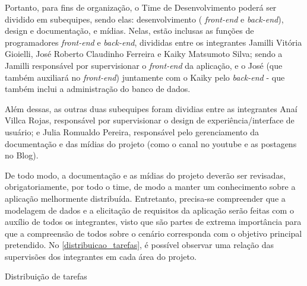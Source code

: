 Portanto, para fins de organização, o Time de Desenvolvimento poderá ser dividido em subequipes, sendo elas: desenvolvimento ( \textsl{\gls{front-end}} e \textsl{\gls{back-end}}), design e documentação, e mídias. Nelas, estão inclusas as funções de programadores \textsl{\gls{front-end}} e \textsl{\gls{back-end}}, divididas entre os integrantes Jamilli Vitória Gioielli, José Roberto Claudinho Ferreira e Kaiky Matsumoto Silva; sendo a Jamilli responsável por supervisionar o \textsl{\gls{front-end}} da aplicação, e o José (que também auxiliará no \textsl{\gls{front-end}}) juntamente com o Kaiky pelo \textsl{\gls{back-end}} - que também inclui a administração do banco de dados. 

Além dessas, as outras duas subequipes foram dividias entre as integrantes Anaí Villca Rojas, responsável  por supervisionar o design de experiência/interface de usuário; e Julia Romualdo Pereira, responsável pelo gerenciamento da documentação e das mídias do projeto (como o canal no \gls{youtube} e as postagens no Blog). 

De todo modo, a documentação e as mídias do projeto deverão ser revisadas, obrigatoriamente, por todo o time, de modo a manter um conhecimento sobre a aplicação melhormente distribuída. Entretanto, precisa-se compreender que a modelagem de dados e a elicitação de requisitos da aplicação serão feitas com o auxílio de todos os integrantes, visto que são partes de extrema importância para que a compreensão de todos sobre o cenário corresponda com o objetivo principal pretendido. No \autoref{distribuicao_tarefas}, é possível observar uma relação das supervisões dos integrantes em cada área do projeto. 

\begin{quadro}[htb]
\centering
\ABNTEXfontereduzida
\caption{Distribuição de tarefas}
\label{distribuicao_tarefas}
\end{quadro}
\FloatBarrier 

